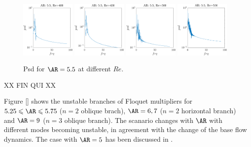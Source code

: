 \begin{figure}
  \centering
  \includegraphics[width=0.24\textwidth]{./fig/nnl/psdAR5.5RE400.png}
  \includegraphics[width=0.24\textwidth]{./fig/nnl/psdAR5.5RE450.png}
  \includegraphics[width=0.24\textwidth]{./fig/nnl/psdAR5.5RE500.png}
  \includegraphics[width=0.24\textwidth]{./fig/nnl/psdAR5.5RE550.png}
  \caption{Psd for $\AR=5.5$ at different $Re$.}
  \label{fig:ClCd}
\end{figure}
\fi

\iffalse
XX FIN QUI XX

Figure \ref{} shows the unstable branches of Floquet multipliers for $5.25 \le \AR \le 5.75$ ($n=2$ oblique brach), $\AR=6,7$ ($n=2$ horizontal branch) and $\AR=9$ ($n=3$ oblique branch). The scanario changes with $\AR$ with different modes becoming unstable, in agreement with the change of the base flow dynamics. The case with $\AR=5$ has been discussed in \cite{chiarini-quadrio-auteri-2022d}.

